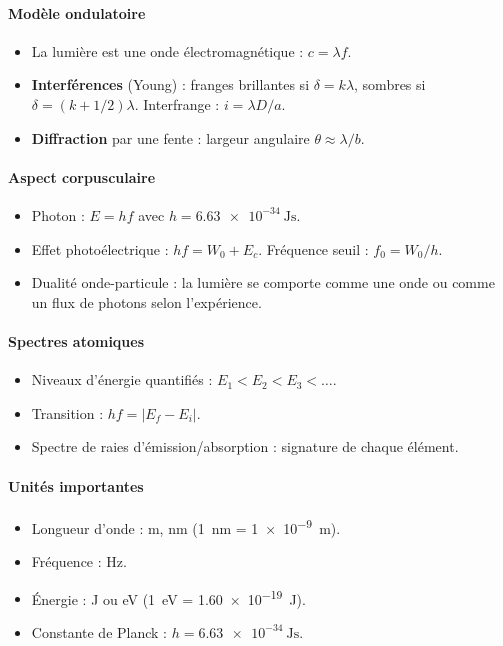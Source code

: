 \begin{synthese}
\paragraph{Modèle ondulatoire}
\begin{itemize}
  \item La lumière est une onde électromagnétique : \(c = \lambda f\).
  \item \textbf{Interférences} (Young) : franges brillantes si \(\delta = k\lambda\), sombres si \(\delta = (k+1/2)\lambda\). Interfrange : \(i = \lambda D / a\).
  \item \textbf{Diffraction} par une fente : largeur angulaire \(\theta \approx \lambda / b\).
\end{itemize}

\paragraph{Aspect corpusculaire}
\begin{itemize}
  \item Photon : \(E = h f\) avec \(h = \SI{6.63e-34}{\joule\second}\).
  \item Effet photoélectrique : \(h f = W_0 + E_c\). Fréquence seuil : \(f_0 = W_0 / h\).
  \item Dualité onde-particule : la lumière se comporte comme une onde ou comme un flux de photons selon l'expérience.
\end{itemize}

\paragraph{Spectres atomiques}
\begin{itemize}
  \item Niveaux d'énergie quantifiés : \(E_1 < E_2 < E_3 < \dots\).
  \item Transition : \(h f = |E_f - E_i|\).
  \item Spectre de raies d'émission/absorption : signature de chaque élément.
\end{itemize}

\paragraph{Unités importantes}
\begin{itemize}
  \item Longueur d'onde : \si{\metre}, \si{\nano\metre} (\SI{1}{\nano\metre} = \SI{1e-9}{\metre}).
  \item Fréquence : \si{\hertz}.
  \item Énergie : \si{\joule} ou \si{\electronvolt} (\SI{1}{\electronvolt} = \SI{1.60e-19}{\joule}).
  \item Constante de Planck : \(h = \SI{6.63e-34}{\joule\second}\).
\end{itemize}


\end{synthese}
